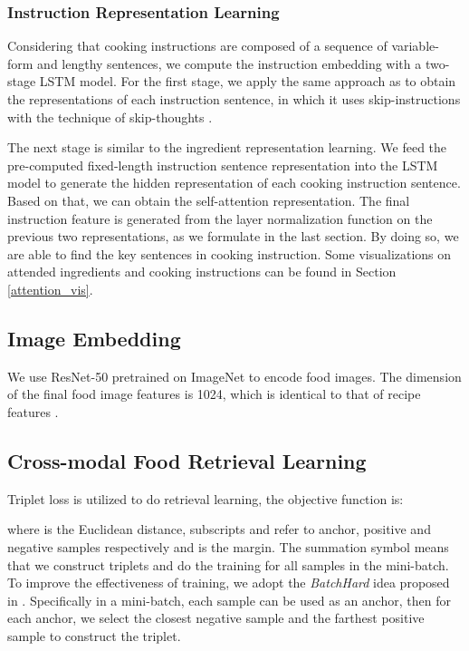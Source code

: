\documentclass[journal]{IEEEtran}
\begin{document}
\subsubsection{Instruction Representation Learning}
Considering that cooking instructions are composed of a sequence of variable-form and lengthy sentences, we compute the instruction embedding with a two-stage LSTM model. For the first stage, we apply the same approach as \cite{salvador2017learning} to obtain the representations of each instruction sentence, in which it uses skip-instructions \cite{salvador2017learning} with the technique of skip-thoughts \cite{kiros2015skip}. 

The next stage is similar to the ingredient representation learning. We feed the pre-computed fixed-length instruction sentence representation into the LSTM model to generate the hidden representation of each cooking instruction sentence. Based on that, we can obtain the self-attention representation. The final instruction feature  is generated from the layer normalization function on the previous two representations, as we formulate in the last section. By doing so, we are able to find the key sentences in cooking instruction. Some visualizations on attended ingredients and cooking instructions can be found in Section \ref{attention_vis}.

\subsection{Image Embedding}
We use ResNet-50 \cite{he2016deep} pretrained on ImageNet to encode food images. The dimension of the final food image features  is 1024, which is identical to that of recipe features .

\subsection{Cross-modal Food Retrieval Learning}
Triplet loss is utilized to do retrieval learning, the objective function is:


where  is the Euclidean distance, subscripts  and  refer to anchor, positive and negative samples respectively and  is the margin. The summation symbol means that we construct triplets and do the training for all samples in the mini-batch. To improve the effectiveness of training, we adopt the \emph{BatchHard} idea proposed in \cite{hermans2017defense}. Specifically in a mini-batch, each sample can be used as an anchor, then for each anchor, we select the closest negative sample and the farthest positive sample to construct the triplet.
\end{document}
